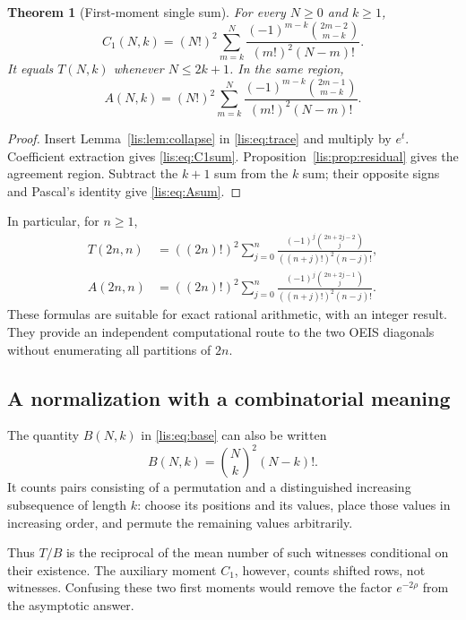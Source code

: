 \documentclass[11pt,letterpaper]{article}
\numberwithin{equation}{section}
\newtheorem{theorem}{Theorem}[section]
\theoremstyle{definition}
\begin{document}
\begin{theorem}[First-moment single sum]\label{lis:thm:single}
For every $N\ge0$ and $k\ge1$,
\begin{equation}
 C_1(N,k)=(N!)^2\sum_{m=k}^{N}
       \frac{(-1)^{m-k}\binom{2m-2}{m-k}}{(m!)^2(N-m)!}.
 \label{lis:eq:C1sum}
\end{equation}
It equals $T(N,k)$ whenever $N\le2k+1$. In the same region,
\begin{equation}
 A(N,k)=(N!)^2\sum_{m=k}^{N}
       \frac{(-1)^{m-k}\binom{2m-1}{m-k}}{(m!)^2(N-m)!}.
 \label{lis:eq:Asum}
\end{equation}
\end{theorem}
\begin{proof}
Insert Lemma~\ref{lis:lem:collapse} in \eqref{lis:eq:trace} and multiply by
$e^t$. Coefficient extraction gives \eqref{lis:eq:C1sum}.
Proposition~\ref{lis:prop:residual} gives the agreement region.
Subtract the $k+1$ sum from the $k$ sum; their opposite signs and
Pascal's identity give \eqref{lis:eq:Asum}.
\end{proof}

In particular, for $n\ge1$,
\begin{align}
 T(2n,n)&=((2n)!)^2\sum_{j=0}^{n}
  \frac{(-1)^j\binom{2n+2j-2}{j}}{((n+j)!)^2(n-j)!},
  \label{lis:eq:A269single}\\
 A(2n,n)&=((2n)!)^2\sum_{j=0}^{n}
  \frac{(-1)^j\binom{2n+2j-1}{j}}{((n+j)!)^2(n-j)!}.
  \label{lis:eq:A267single}
\end{align}
These formulas are suitable for exact rational arithmetic, with an
integer result. They provide an independent computational route to the
two OEIS diagonals without enumerating all partitions of $2n$.

\subsection{A normalization with a combinatorial meaning}
The quantity $B(N,k)$ in \eqref{lis:eq:base} can also be written
\begin{equation}
 B(N,k)=\binom Nk^2(N-k)!.
 \label{lis:eq:Bwitness}
\end{equation}
It counts pairs consisting of a permutation and a distinguished
increasing subsequence of length $k$: choose its positions and its
values, place those values in increasing order, and permute the
remaining values arbitrarily.

Thus $T/B$ is the reciprocal of the mean number of such witnesses
conditional on their existence. The auxiliary moment $C_1$, however,
counts shifted rows, not witnesses. Confusing these two first moments
would remove the factor $e^{-2\rho}$ from the asymptotic answer.
\end{document}

